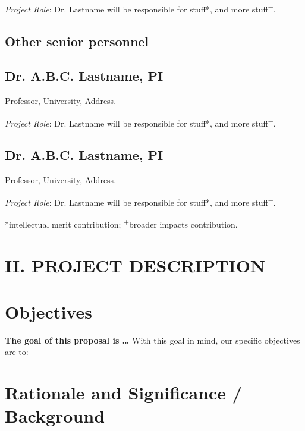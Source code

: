 \documentclass[10pt,letterpaper]{article}
\begin{document}
\emph{Project Role}: Dr. Lastname will be responsible for stuff*, and more stuff\textsuperscript{+}.


\vspace{5mm}

\subsection*{Other senior personnel}

\subsection*{Dr. A.B.C. Lastname, PI}
\noindent Professor, University, Address.

\emph{Project Role}: Dr. Lastname will be responsible for stuff*, and more stuff\textsuperscript{+}.


\subsection*{Dr. A.B.C. Lastname, PI}
\noindent Professor, University, Address.

\emph{Project Role}: Dr. Lastname will be responsible for stuff*, and more stuff\textsuperscript{+}.



\vspace{10mm}

*intellectual merit contribution; \textsuperscript{+}broader impacts contribution.


\newpage

\section*{II. PROJECT DESCRIPTION}

\section{Objectives}

\Blindtext



\textbf{The goal of this proposal is \ldots} With this goal in mind, our specific objectives are to:

\blindenumerate


\section{Rationale and Significance / Background}
\end{document}
